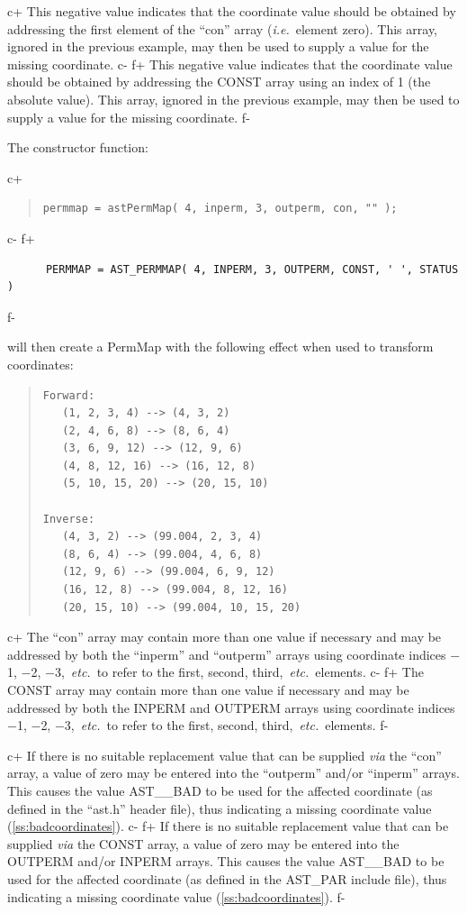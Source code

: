 \documentclass[twoside,11pt]{article}
\newcommand{\secref}[1]{\S\ref{#1}}
\renewcommand{\secref}[1]{\ref{#1}}
\begin{document}
c+
This negative value indicates that the coordinate value should be
obtained by addressing the first element of the ``con'' array
({\em{i.e.}}\ element zero). This array, ignored in the previous
example, may then be used to supply a value for the missing
coordinate.
c-
f+
This negative value indicates that the coordinate value should be
obtained by addressing the CONST array using an index of 1 (the
absolute value). This array, ignored in the previous example, may then
be used to supply a value for the missing coordinate.
f-

The constructor function:

c+
\begin{quote}
\small
\begin{verbatim}
permmap = astPermMap( 4, inperm, 3, outperm, con, "" );
\end{verbatim}
\normalsize
\end{quote}
c-
f+
\small
\begin{verbatim}
      PERMMAP = AST_PERMMAP( 4, INPERM, 3, OUTPERM, CONST, ' ', STATUS )
\end{verbatim}
\normalsize
f-

will then create a PermMap with the following effect when used to
transform coordinates:

\begin{quote}
\begin{verbatim}
Forward:
   (1, 2, 3, 4) --> (4, 3, 2)
   (2, 4, 6, 8) --> (8, 6, 4)
   (3, 6, 9, 12) --> (12, 9, 6)
   (4, 8, 12, 16) --> (16, 12, 8)
   (5, 10, 15, 20) --> (20, 15, 10)

Inverse:
   (4, 3, 2) --> (99.004, 2, 3, 4)
   (8, 6, 4) --> (99.004, 4, 6, 8)
   (12, 9, 6) --> (99.004, 6, 9, 12)
   (16, 12, 8) --> (99.004, 8, 12, 16)
   (20, 15, 10) --> (99.004, 10, 15, 20)
\end{verbatim}
\end{quote}

c+
The ``con'' array may contain more than one value if necessary and may
be addressed by both the ``inperm'' and ``outperm'' arrays using
coordinate indices $-$1, $-$2, $-$3,~{\em{etc.}}\ to refer to the
first, second, third,~{\em{etc.}}\ elements.
c-
f+
The CONST array may contain more than one value if necessary and may
be addressed by both the INPERM and OUTPERM arrays using coordinate
indices $-$1, $-$2, $-$3,~{\em{etc.}}\ to refer to the first, second,
third,~{\em{etc.}}\ elements.
f-

c+
If there is no suitable replacement value that can be supplied
{\em{via}} the ``con'' array, a value of zero may be entered into the
``outperm'' and/or ``inperm'' arrays. This causes the value AST\_\_BAD
to be used for the affected coordinate (as defined in the ``ast.h''
header file), thus indicating a missing coordinate value
(\secref{ss:badcoordinates}).
c-
f+
If there is no suitable replacement value that can be supplied
{\em{via}} the CONST array, a value of zero may be entered into the
OUTPERM and/or INPERM arrays. This causes the value AST\_\_BAD to be
used for the affected coordinate (as defined in the AST\_PAR include
file), thus indicating a missing coordinate value
(\secref{ss:badcoordinates}).
f-
\end{document}
